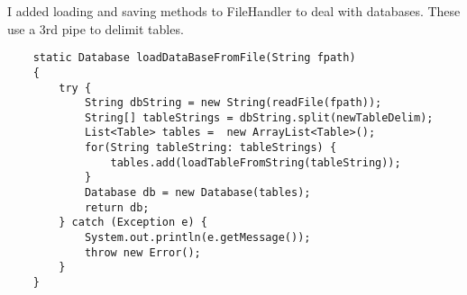 \documentclass[11pt]{article} %
\begin{document}
I added loading and saving methods to FileHandler to deal with databases. These use a 3rd pipe to delimit tables.

\begin{lstlisting}
    static Database loadDataBaseFromFile(String fpath)
    {
        try {
            String dbString = new String(readFile(fpath));
            String[] tableStrings = dbString.split(newTableDelim);
            List<Table> tables =  new ArrayList<Table>();
            for(String tableString: tableStrings) {
                tables.add(loadTableFromString(tableString));
            }
            Database db = new Database(tables);
            return db;
        } catch (Exception e) {
            System.out.println(e.getMessage());
            throw new Error();
        }
    }
\end{lstlisting}




\begin{lstlisting}

\end{lstlisting}




\begin{lstlisting}

\end{lstlisting}




\begin{lstlisting}

\end{lstlisting}



\begin{lstlisting}

\end{lstlisting}
\end{document}
